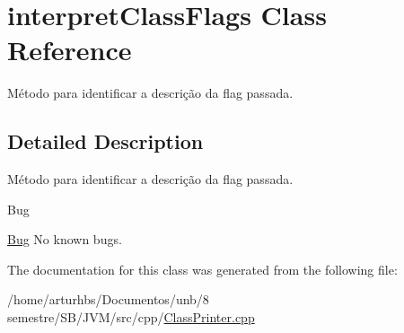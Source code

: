 \hypertarget{classinterpretClassFlags}{}\section{interpret\+Class\+Flags Class Reference}
\label{classinterpretClassFlags}


Método para identificar a descrição da flag passada.  




\subsection{Detailed Description}
Método para identificar a descrição da flag passada. 

\begin{DoxyRefDesc}{Bug}
\item[\hyperlink{bug__bug000004}{Bug}]No known bugs. \end{DoxyRefDesc}


The documentation for this class was generated from the following file\+:\begin{DoxyCompactItemize}
\item 
/home/arturhbs/\+Documentos/unb/8 semestre/\+S\+B/\+J\+V\+M/src/cpp/\hyperlink{ClassPrinter_8cpp}{Class\+Printer.\+cpp}\end{DoxyCompactItemize}
